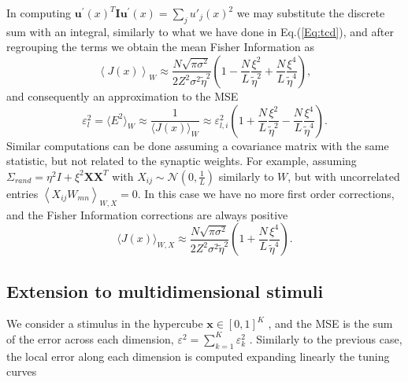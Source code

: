 \documentclass[a4paper]{article}%
\begin{document}
In computing $ \mathbf{u^{\prime}}(x)^{T}
\mathbf{I} \mathbf{u^{\prime}}(x) = \sum_j u'_j(x)^2 $  we may substitute the discrete sum with an integral, similarly to what we
have done in Eq.(\ref{Eq:tcd}), and after regrouping the terms we obtain the mean Fisher Information as
\begin{equation}
\left\langle J(x)\right\rangle_{W} \approx\frac{N \sqrt{\pi\sigma^{2}}}{2 Z^{2}
\sigma^{2}\tilde\eta^{2}}(1 -\frac{N}{L}\frac{\xi^{2}}{\tilde\eta^{2}} +
\frac{N}{L}\frac{\xi^{4}}{\tilde\eta^{4}}),
\end{equation}
and consequently an approximation to the MSE
\begin{equation}
 \varepsilon_l^2 = \langle E^{2}\rangle_{W} \approx\frac{1}{\langle J(x)\rangle_{W}}
\approx\varepsilon_{l,i}^{2} (1+\frac{N}{L}\frac{\xi^{2}}{\tilde\eta^{2}}-
\frac{N}{L}\frac{\xi^{4}}{\tilde\eta^{4}}).
\end{equation}
Similar computations can be done assuming a covariance matrix with the same
statistic, but not related to the synaptic weights. For example, assuming
$\Sigma_{rand} = \eta^{2} I + \xi^{2} \mathbf{X}\mathbf{X}^{T}$ with $X_{ij}
\sim\mathcal{N}(0,\frac{1}{L})$ similarly to $W$, but with uncorrelated
entries $\left \langle X_{ij}W_{mn}\right\rangle _{W,X}= 0$. In this case we have no more first order
corrections, and the Fisher Information corrections are always positive 
\begin{equation}
\langle J(x)\rangle_{W,X} \approx\frac{N \sqrt{\pi\sigma^{2}}}{2 Z^{2}
\sigma^{2}\tilde\eta^{2}}(1 + \frac{N}{L}\frac{\xi^{4}}{\tilde\eta^{4}}).
\end{equation}


\subsection{Extension to multidimensional stimuli}
We consider a stimulus in the hypercube $\mathbf{x}
\in[0,1]^{K}$ , and the 
MSE is the sum of the error across each dimension, $\varepsilon^{2} = \sum_{k=1}^K \varepsilon_{k}^{2}$ . Similarly to the previous case, the local error along each dimension
is computed expanding linearly the tuning curves
\end{document}

